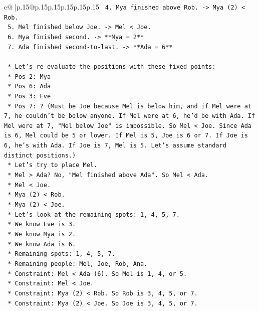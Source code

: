 \documentclass{article}
\begin{document}
{\begin{supertabular}{c@{$\;$}|p{.15\linewidth}@{}p{.15\linewidth}p{.15\linewidth}p{.15\linewidth}p{.15\linewidth}p{.15\linewidth}}
{{{\texttt{        4. Mya finished above Rob. {-}> Mya (2) < Rob.} \\
\texttt{        5. Mel finished below Joe. {-}> Mel < Joe.} \\
\texttt{        6. Mya finished second. {-}> **Mya = 2**} \\
\texttt{        7. Ada finished second{-}to{-}last. {-}> **Ada = 6**} \\
\\ 
\texttt{    *   Let's re{-}evaluate the positions with these fixed points:} \\
\texttt{        *   Pos 2: Mya} \\
\texttt{        *   Pos 6: Ada} \\
\texttt{        *   Pos 3: Eve} \\
\texttt{        *   Pos 7: ? (Must be Joe because Mel is below him, and if Mel were at 7, he couldn't be below anyone. If Mel were at 6, he'd be with Ada. If Mel were at 7, "Mel below Joe" is impossible. So Mel < Joe. Since Ada is 6, Mel could be 5 or lower. If Mel is 5, Joe is 6 or 7. If Joe is 6, he's with Ada. If Joe is 7, Mel is 5. Let's assume standard distinct positions.)} \\
\texttt{        *   Let's try to place Mel.} \\
\texttt{            *   Mel > Ada? No, "Mel finished above Ada". So Mel < Ada.} \\
\texttt{            *   Mel < Joe.} \\
\texttt{            *   Mya (2) < Rob.} \\
\texttt{            *   Mya (2) < Joe.} \\
\texttt{        *   Let's look at the remaining spots: 1, 4, 5, 7.} \\
\texttt{        *   We know Eve is 3.} \\
\texttt{        *   We know Mya is 2.} \\
\texttt{        *   We know Ada is 6.} \\
\texttt{        *   Remaining spots: 1, 4, 5, 7.} \\
\texttt{        *   Remaining people: Mel, Joe, Rob, Ana.} \\
\texttt{        *   Constraint: Mel < Ada (6). So Mel is 1, 4, or 5.} \\
\texttt{        *   Constraint: Mel < Joe.} \\
\texttt{        *   Constraint: Mya (2) < Rob. So Rob is 3, 4, 5, or 7.} \\
\texttt{        *   Constraint: Mya (2) < Joe. So Joe is 3, 4, 5, or 7.} \\
}}}
\end{supertabular}}
\end{document}
